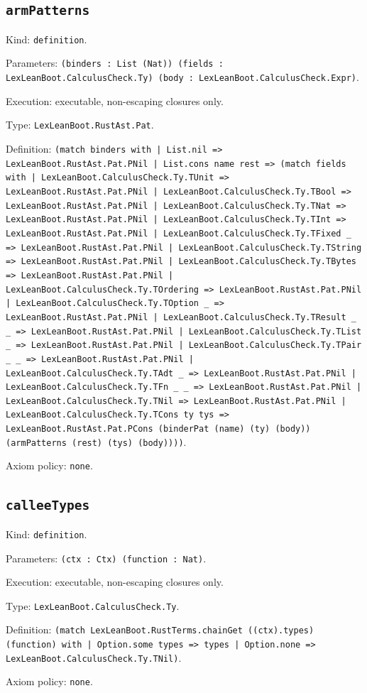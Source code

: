 \documentclass[11pt]{article}
\begin{document}
\subsection*{\texttt{armPatterns}}
\noindent Kind: \texttt{definition}.\par
\noindent Parameters: \texttt{(binders : List (Nat)) (fields : LexLeanBoot.CalculusCheck.Ty) (body : LexLeanBoot.CalculusCheck.Expr)}.\par
\noindent Execution: executable, non-escaping closures only.\par
\noindent Type: \texttt{LexLeanBoot.RustAst.Pat}.\par
\noindent Definition: \texttt{(match binders with | List.nil => LexLeanBoot.RustAst.Pat.PNil | List.cons name rest => (match fields with | LexLeanBoot.CalculusCheck.Ty.TUnit => LexLeanBoot.RustAst.Pat.PNil | LexLeanBoot.CalculusCheck.Ty.TBool => LexLeanBoot.RustAst.Pat.PNil | LexLeanBoot.CalculusCheck.Ty.TNat => LexLeanBoot.RustAst.Pat.PNil | LexLeanBoot.CalculusCheck.Ty.TInt => LexLeanBoot.RustAst.Pat.PNil | LexLeanBoot.CalculusCheck.Ty.TFixed \_ => LexLeanBoot.RustAst.Pat.PNil | LexLeanBoot.CalculusCheck.Ty.TString => LexLeanBoot.RustAst.Pat.PNil | LexLeanBoot.CalculusCheck.Ty.TBytes => LexLeanBoot.RustAst.Pat.PNil | LexLeanBoot.CalculusCheck.Ty.TOrdering => LexLeanBoot.RustAst.Pat.PNil | LexLeanBoot.CalculusCheck.Ty.TOption \_ => LexLeanBoot.RustAst.Pat.PNil | LexLeanBoot.CalculusCheck.Ty.TResult \_ \_ => LexLeanBoot.RustAst.Pat.PNil | LexLeanBoot.CalculusCheck.Ty.TList \_ => LexLeanBoot.RustAst.Pat.PNil | LexLeanBoot.CalculusCheck.Ty.TPair \_ \_ => LexLeanBoot.RustAst.Pat.PNil | LexLeanBoot.CalculusCheck.Ty.TAdt \_ => LexLeanBoot.RustAst.Pat.PNil | LexLeanBoot.CalculusCheck.Ty.TFn \_ \_ => LexLeanBoot.RustAst.Pat.PNil | LexLeanBoot.CalculusCheck.Ty.TNil => LexLeanBoot.RustAst.Pat.PNil | LexLeanBoot.CalculusCheck.Ty.TCons ty tys => LexLeanBoot.RustAst.Pat.PCons (binderPat (name) (ty) (body)) (armPatterns (rest) (tys) (body))))}.\par
\noindent Axiom policy: \texttt{none}.\par
\subsection*{\texttt{calleeTypes}}
\noindent Kind: \texttt{definition}.\par
\noindent Parameters: \texttt{(ctx : Ctx) (function : Nat)}.\par
\noindent Execution: executable, non-escaping closures only.\par
\noindent Type: \texttt{LexLeanBoot.CalculusCheck.Ty}.\par
\noindent Definition: \texttt{(match LexLeanBoot.RustTerms.chainGet ((ctx).types) (function) with | Option.some types => types | Option.none => LexLeanBoot.CalculusCheck.Ty.TNil)}.\par
\noindent Axiom policy: \texttt{none}.\par
\end{document}
